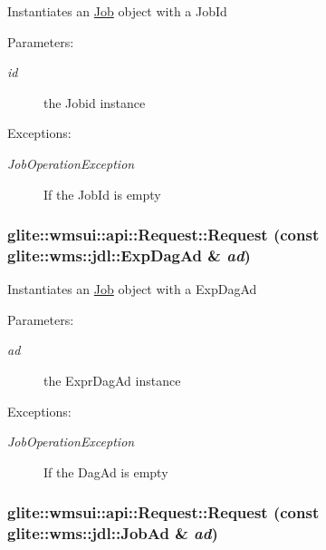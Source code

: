 Instantiates an \hyperlink{classglite_1_1wmsui_1_1api_1_1Job}{Job} object with a Job\-Id \begin{Desc}
\item[Parameters:]
\begin{description}
\item[{\em id}]the Jobid instance \end{description}
\end{Desc}
\begin{Desc}
\item[Exceptions:]
\begin{description}
\item[{\em Job\-Operation\-Exception}]If the Job\-Id is empty \end{description}
\end{Desc}
\hypertarget{classglite_1_1wmsui_1_1api_1_1Request_z9_2}{
\subsubsection[Request]{\setlength{\rightskip}{0pt plus 5cm}glite::wmsui::api::Request::Request (const glite::wms::jdl::Exp\-Dag\-Ad \& {\em ad})}}
\label{classglite_1_1wmsui_1_1api_1_1Request_z9_2}


Instantiates an \hyperlink{classglite_1_1wmsui_1_1api_1_1Job}{Job} object with a Exp\-Dag\-Ad \begin{Desc}
\item[Parameters:]
\begin{description}
\item[{\em ad}]the Expr\-Dag\-Ad instance \end{description}
\end{Desc}
\begin{Desc}
\item[Exceptions:]
\begin{description}
\item[{\em Job\-Operation\-Exception}]If the Dag\-Ad is empty \end{description}
\end{Desc}
\hypertarget{classglite_1_1wmsui_1_1api_1_1Request_z9_3}{
\subsubsection[Request]{\setlength{\rightskip}{0pt plus 5cm}glite::wmsui::api::Request::Request (const glite::wms::jdl::Job\-Ad \& {\em ad})}}
\label{classglite_1_1wmsui_1_1api_1_1Request_z9_3}


